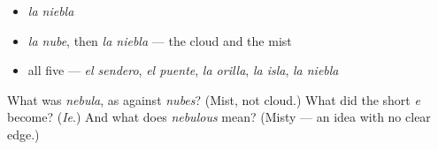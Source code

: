 \begin{itemize}
\raggedright
  \item \emph{la niebla}
  \item \emph{la nube}, then \emph{la niebla} — the cloud and the mist
  \item all five — \emph{el sendero}, \emph{el puente}, \emph{la orilla}, \emph{la isla}, \emph{la niebla}
\end{itemize}

\begin{tcolorbox}[breakable,colback=teal!4,colframe=teal!35!black,title={Before you move on}]
What was \emph{nebula}, as against \emph{nubes}? (Mist, not cloud.) What did the short \emph{e} become? (\emph{Ie}.) And what does \emph{nebulous} mean? (Misty — an idea with no clear edge.)
\end{tcolorbox}
